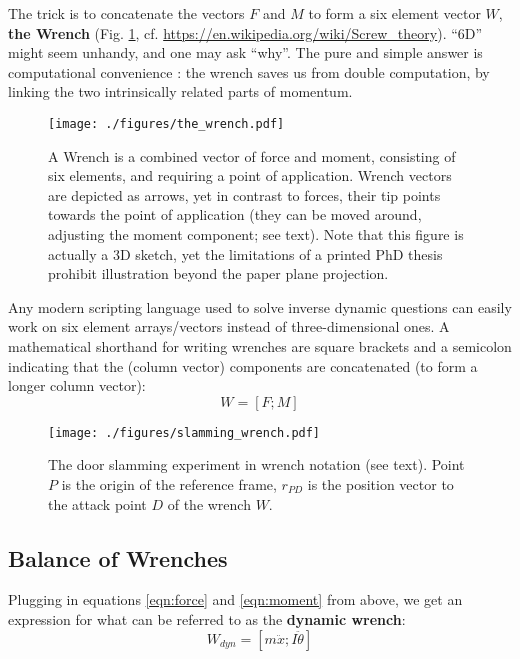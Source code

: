 \documentclass[10pt,a4paper]{article}
\begin{document}
The trick is to concatenate the vectors \(F\) and \(M\) to form a six element vector \(W\), \textbf{the Wrench} (Fig. \ref{fig:wrench}, cf. \url{https://en.wikipedia.org/wiki/Screw\_theory}).
``6D'' might seem unhandy, and one may ask ``why''.
The pure and simple answer is computational convenience \citep{Dumas2004,Mueller2018}: the wrench saves us from double computation, by linking the two intrinsically related parts of momentum.

\begin{figure}[htbp]
\centering
\texttt{[image: ./figures/the\_wrench.pdf]}
\caption{\label{fig:wrench}A Wrench is a combined vector of force and moment, consisting of six elements, and requiring a point of application. Wrench vectors are depicted as arrows, yet in contrast to forces, their tip points towards the point of application (they can be moved around, adjusting the moment component; see text). Note that this figure is actually a 3D sketch, yet the limitations of a printed PhD thesis prohibit illustration beyond the paper plane projection.}
\end{figure}


Any modern scripting language used to solve inverse dynamic questions can easily work on six element arrays/vectors instead of three-dimensional ones.
A mathematical shorthand for writing wrenches are square brackets and a semicolon indicating that the (column vector) components are concatenated (to form a longer column vector):
\[W = \left[ F; M \right]\]

\begin{figure}[htbp]
\centering
\texttt{[image: ./figures/slamming\_wrench.pdf]}
\caption{\label{fig:slamming_wrench}The door slamming experiment in wrench notation (see text). Point \(P\) is the origin of the reference frame, \(r_{PD}\) is the position vector to the attack point \(D\) of the wrench \(W\).}
\end{figure}


\subsection{Balance of Wrenches}
\label{sec:org16cd93a}
Plugging in equations \eqref{eqn:force} and \eqref{eqn:moment} from above, we get an expression for what can be referred to as the \textbf{dynamic wrench}:
\begin{equation}\label{eqn:dynamic_wrench}
W_{dyn} = \left[ m\ddot x; I\ddot \theta \right]
\end{equation}
\end{document}

